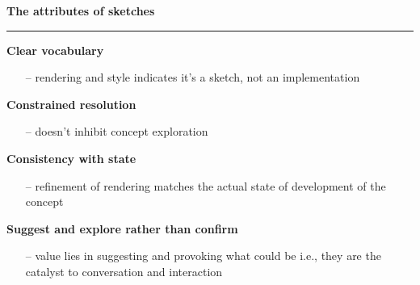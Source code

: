 \documentclass[pdf]{beamer}
\begin{document}
\begin{frame}
\vspace{8mm}
\textcolor{myBlue}{\textbf{\Large{The attributes of sketches}}}

\textcolor{red}{\rule{10cm}{1mm}}

\begin{samepage}    
    \begin{multicols}{2}
      \textbf{Clear vocabulary} \par
    \begin{itemize}
      \item[\textcolor{black}{--}] rendering and style indicates it’s a sketch, not an implementation 
    \end{itemize}
      \textbf{Constrained resolution} \par
    \begin{itemize}
      \item[\textcolor{black}{--}] doesn’t inhibit concept exploration
    \end{itemize}
      \textbf{Consistency with state} \par
    \begin{itemize}
      \item[\textcolor{black}{--}] refinement of rendering matches the actual state of development of the concept 
    \end{itemize}
     \textbf{Suggest and explore rather than confirm} \par
    \begin{itemize}
      \item[\textcolor{black}{--}] value lies in suggesting and provoking what could be i.e., they are the catalyst to conversation and interaction
    \end{itemize}
    
	\end{multicols}
   \end{samepage}
\end{frame}
\end{document}
